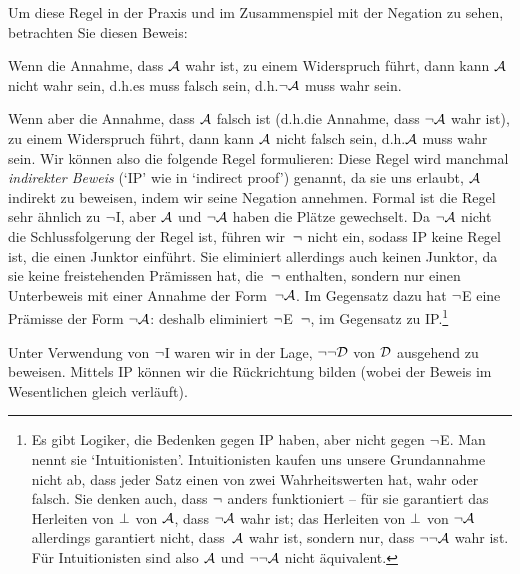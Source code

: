 Um diese Regel in der Praxis und im Zusammenspiel mit der Negation zu sehen, betrachten Sie diesen Beweis:
	\begin{fitchproof}
		\open
		\close
	\end{fitchproof}

Wenn die Annahme, dass $\mathcal{A}$ wahr ist, zu einem Widerspruch führt, dann kann $\mathcal{A}$ nicht wahr sein, d.h.\@ es muss falsch sein, d.h.\@ $\neg\mathcal{A}$ muss wahr sein. 

Wenn aber die Annahme, dass $\mathcal{A}$ falsch ist (d.h.\@ die Annahme, dass $\neg\mathcal{A}$ wahr ist), zu einem Widerspruch führt, dann kann $\mathcal{A}$ nicht falsch sein, d.h.\@ $\mathcal{A}$ muss wahr sein. Wir können also die folgende Regel formulieren:
Diese Regel wird manchmal \emph{indirekter Beweis} (`IP' wie in `indirect proof') genannt, da sie uns erlaubt, $\mathcal{A}$ indirekt zu beweisen, indem wir seine Negation annehmen. Formal ist die Regel sehr ähnlich zu $\neg$I, aber $\mathcal{A}$ und $\neg\mathcal{A}$ haben die Plätze gewechselt. Da $\neg\mathcal{A}$ nicht die Schlussfolgerung der Regel ist, führen wir~$\neg$ nicht ein, sodass IP keine Regel ist, die einen Junktor einführt. Sie eliminiert allerdings auch keinen Junktor, da sie keine freistehenden Prämissen hat, die~$\neg$ enthalten, sondern nur einen Unterbeweis mit einer Annahme der Form~$\neg\mathcal{A}$. Im Gegensatz dazu hat $\neg$E eine Prämisse der Form $\neg\mathcal{A}$: deshalb eliminiert $\neg$E~$\neg$, im Gegensatz zu IP.\footnote{Es gibt Logiker, die Bedenken gegen IP haben, aber nicht gegen $\neg$E. Man nennt sie `Intuitionisten'. Intuitionisten kaufen uns unsere Grundannahme nicht ab, dass jeder Satz einen von zwei Wahrheitswerten hat, wahr oder falsch. Sie denken auch, dass $\neg$ anders funktioniert -- für sie garantiert das Herleiten von $\bot$ von $\mathcal{A}$, dass $\neg \mathcal{A}$ wahr ist; das Herleiten von $\bot$ von $\neg\mathcal{A}$ allerdings garantiert nicht, dass~$\mathcal{A}$ wahr ist, sondern nur, dass $\neg\neg\mathcal{A}$ wahr ist. Für Intuitionisten sind also $\mathcal{A}$ und $\neg\neg\mathcal{A}$ nicht äquivalent.} 

Unter Verwendung von $\neg$I waren wir in der Lage, $\neg\neg\mathcal{D}$ von $\mathcal{D}$ ausgehend zu beweisen. Mittels IP können wir die Rückrichtung bilden (wobei der Beweis im Wesentlichen gleich verläuft).
	\begin{fitchproof}
		\open
		\close
	\end{fitchproof}

